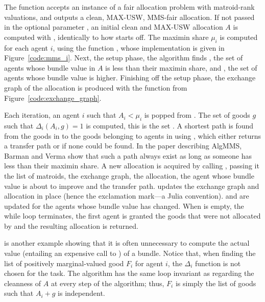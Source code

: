 The function accepts an instance of a fair allocation problem with matroid-rank valuations, and outputs a clean, MAX-USW, MMS-fair allocation. If not passed in the optional parameter , an initial clean and MAX-USW allocation $A$ is computed with , identically to how  starts off. The maximin share $\mu_i$ is computed for each agent $i$, using the function , whose implementation is given in Figure~\ref{code:mms_i}. Next, the setup phase, the algorithm finds , the set of agents whose bundle value in $A$ is less than their maximin share, and , the set of agents whose bundle value is higher. Finishing off the setup phase, the exchange graph of the allocation is produced with the function  from Figure~\ref{code:exchange_graph}.

Each iteration, an agent $i$ such that $A_i<\mu_i$ is popped from . The set of goods $g$ such that $\Delta_i(A_i, g) = 1$ is computed, this is the set . A shortest path is found from the goods in  to the goods belonging to agents in  using , which either returns a transfer path or  if none could be found. In the paper describing AlgMMS, Barman and Verma show that such a path always exist as long as someone has less than their maximin share. A new allocation is acquired by calling , passing it the list of matroids, the exchange graph, the allocation, the agent whose bundle value is about to improve and the transfer path.  updates the exchange graph and allocation in place (hence the exclamation mark---a Julia convention).  and  are updated for the agents whose bundle value has changed. When  is empty, the while loop terminates, the first agent is granted the goods that were not allocated by  and the resulting allocation is returned.

 is another example showing that it is often unnecessary to compute the actual value (entailing an expensive call to ) of a bundle. Notice that, when finding the list of positively marginal-valued good $F_i$ for agent $i$, the $\Delta_i$ function is not chosen for the task. The algorithm has the same loop invariant as  regarding the cleanness of $A$ at every step of the algorithm; thus, $F_i$ is simply the list of goods such that $A_i + g$ is independent. 

